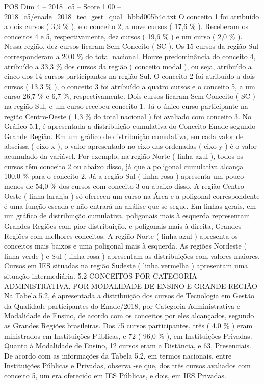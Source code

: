 \begin{textsample}{POS Dim 4 – 2018\_c5 – Score 1.00 – 2018\_c5/enade\_2018\_tec\_gest\_qual\_bbbd005b4c.txt}
O conceito 1 foi atribuído a dois cursos ( 3,9 \% ), e o conceito 2, a nove cursos ( 17,6 \% ).
Receberam os conceitos 4 e 5, respectivamente, dez cursos ( 19,6 \% ) e um curso ( 2,0 \% ).
Nessa região, dez cursos ficaram Sem Conceito ( SC ).
Os 15 cursos da região Sul corresponderam a 20,0 \% do total nacional.
Houve predominância do conceito 4, atribuído a 33,3 \% dos cursos da região ( conceito modal ), ou seja, atribuído a cinco dos 14 cursos participantes na região Sul.
O conceito 2 foi atribuído a dois cursos ( 13,3 \% ), o conceito 3 foi atribuído a quatro cursos e o conceito 5, a um curso 26,7 \% e 6,7 \%, respectivamente.
Dois cursos ficaram Sem Conceito ( SC ) na região Sul, e um curso recebeu conceito 1.
Já o único curso participante na região Centro-Oeste ( 1,3 \% do total nacional ) foi avaliado com conceito 3.
No Gráfico 5.1, é apresentada a distribuição cumulativa do Conceito Enade segundo Grande Região.
Em um gráfico de distribuição cumulativa, em cada valor de abscissa ( eixo x ), o valor apresentado no eixo das ordenadas ( eixo y ) é o valor acumulado da variável.
Por exemplo, na região Norte ( linha azul ), todos os cursos têm conceito 2 ou abaixo disso, já que a poligonal cumulativa alcança 100,0 \% para o conceito 2.
Já a região Sul ( linha rosa ) apresenta um pouco menos de 54,0 \% dos cursos com conceito 3 ou abaixo disso.
A região Centro-Oeste ( linha laranja ) só ofereceu um curso na Área e a poligonal correspondente é uma função escada e não entrará na análise que se segue.
Em linhas gerais, em um gráfico de distribuição cumulativa, poligonais mais à esquerda representam Grandes Regiões com pior distribuição, e poligonais mais à direita, Grandes Regiões com melhores conceitos.
A região Norte ( linha azul ) apresenta os conceitos mais baixos e uma poligonal mais à esquerda.
As regiões Nordeste ( linha verde ) e Sul ( linha rosa ) apresentam as distribuições com valores maiores.
Cursos em IES situadas na região Sudeste ( linha vermelha ) apresentam uma situação intermediária. 5.2 CONCEITOS POR CATEGORIA ADMINISTRATIVA, POR MODALIDADE DE ENSINO E GRANDE REGIÃO Na Tabela 5.2, é apresentada a distribuição dos cursos de Tecnologia em Gestão da Qualidade participantes do Enade/2018, por Categoria Administrativa e Modalidade de Ensino, de acordo com os conceitos por eles alcançados, segundo as Grandes Regiões brasileiras.
Dos 75 cursos participantes, três ( 4,0 \% ) eram ministrados em Instituições Públicas, e 72 ( 96,0 \% ), em Instituições Privadas.
Quanto à Modalidade de Ensino, 12 cursos eram a Distância, e 63, Presenciais.
De acordo com as informações da Tabela 5.2, em termos nacionais, entre Instituições Públicas e Privadas, observa -se que, dos três cursos avaliados com conceito 5, um era oferecido em IES Públicas, e dois, em IES Privadas.

\end{textsample}
